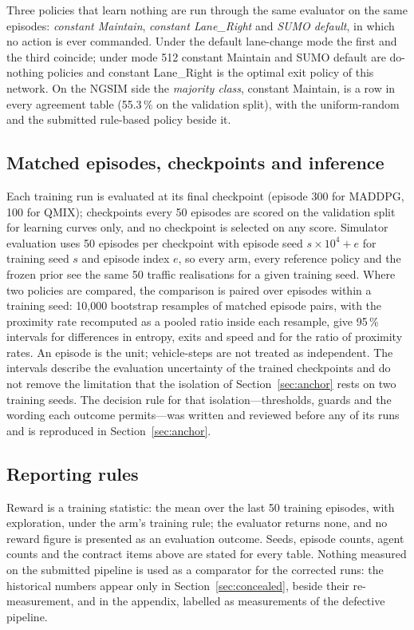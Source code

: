 Three policies that learn nothing are run through the same evaluator on the same episodes: \emph{constant Maintain}, \emph{constant Lane\_Right} and \emph{SUMO default}, in which no action is ever commanded. Under the default lane-change mode the first and the third coincide; under mode 512 constant Maintain and SUMO default are do-nothing policies and constant Lane\_Right is the optimal exit policy of this network. On the NGSIM side the \emph{majority class}, constant Maintain, is a row in every agreement table (55.3\,\% on the validation split), with the uniform-random and the submitted rule-based policy beside it.

\subsection{Matched episodes, checkpoints and inference}
\label{sec:contract_stats}

Each training run is evaluated at its final checkpoint (episode 300 for MADDPG, 100 for QMIX); checkpoints every 50 episodes are scored on the validation split for learning curves only, and no checkpoint is selected on any score. Simulator evaluation uses 50 episodes per checkpoint with episode seed $s\times10^4+e$ for training seed $s$ and episode index $e$, so every arm, every reference policy and the frozen prior see the same 50 traffic realisations for a given training seed. Where two policies are compared, the comparison is paired over episodes within a training seed: 10{,}000 bootstrap resamples of matched episode pairs, with the proximity rate recomputed as a pooled ratio inside each resample, give 95\,\% intervals for differences in entropy, exits and speed and for the ratio of proximity rates. An episode is the unit; vehicle-steps are not treated as independent. The intervals describe the evaluation uncertainty of the trained checkpoints and do not remove the limitation that the isolation of Section~\ref{sec:anchor} rests on two training seeds. The decision rule for that isolation---thresholds, guards and the wording each outcome permits---was written and reviewed before any of its runs and is reproduced in Section~\ref{sec:anchor}.

\subsection{Reporting rules}
\label{sec:contract_report}

Reward is a training statistic: the mean over the last 50 training episodes, with exploration, under the arm's training rule; the evaluator returns none, and no reward figure is presented as an evaluation outcome. Seeds, episode counts, agent counts and the contract items above are stated for every table. Nothing measured on the submitted pipeline is used as a comparator for the corrected runs: the historical numbers appear only in Section~\ref{sec:concealed}, beside their re-measurement, and in the appendix, labelled as measurements of the defective pipeline.
